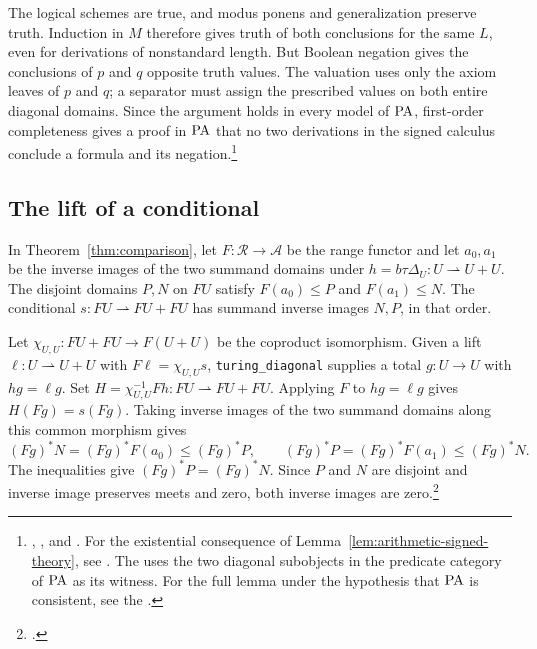 The logical schemes are true, and modus ponens and generalization preserve
truth. Induction in $M$ therefore gives truth of both conclusions for the
same $L$, even for derivations of nonstandard length. But Boolean
negation gives the conclusions of $p$ and $q$ opposite truth values. The
valuation uses only the axiom leaves of $p$ and $q$; a separator
must assign the prescribed values on both entire diagonal domains. Since the argument holds in
every model of $\mathrm{PA}$, first-order completeness gives a proof in $\mathrm{PA}$
that no two derivations in the signed calculus conclude a formula and its
negation.\footnote{,
,
and .
For the existential consequence of Lemma~\ref{lem:arithmetic-signed-theory},
see \CEIregistration. The
 uses the two diagonal
subobjects in the predicate category of $\mathrm{PA}$ as its witness. For the full
lemma under the hypothesis that $\mathrm{PA}$ is consistent, see the
.}

\subsection{The lift of a conditional}

In Theorem~\ref{thm:comparison}, let $F:\mathscr R\to\mathcal A$ be
the range functor and let $a_0,a_1$ be the inverse images of the two
summand domains under $h=b\tau\Delta_U:U\rightharpoonup U+U$.
The disjoint domains $P,N$ on $FU$ satisfy $F(a_0)\leq P$ and
$F(a_1)\leq N$. The conditional $s:FU\rightharpoonup FU+FU$ has
summand inverse images $N,P$, in that order.

Let $\chi_{U,U}:FU+FU\to F(U+U)$ be the coproduct isomorphism. Given
a lift $\ell:U\rightharpoonup U+U$ with $F\ell=\chi_{U,U}s$,
\texttt{turing\_diagonal} supplies a total
$g:U\to U$ with $hg=\ell g$. Set
$H=\chi_{U,U}^{-1}Fh:FU\rightharpoonup FU+FU$. Applying $F$ to $hg=\ell g$
gives $H(Fg)=s(Fg)$. Taking inverse images of the two summand domains
along this common morphism gives
\[
 (Fg)^*N=(Fg)^*F(a_0)\leq (Fg)^*P,\qquad
 (Fg)^*P=(Fg)^*F(a_1)\leq (Fg)^*N.
\]
The inequalities give $(Fg)^*P=(Fg)^*N$. Since $P$ and $N$ are disjoint
and inverse image preserves meets and zero, both inverse images are zero.\footnote{.}

